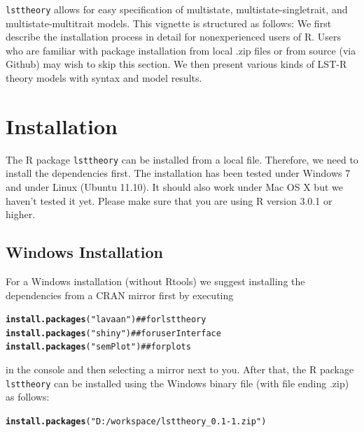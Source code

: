\documentclass[10pt]{article}\usepackage{graphicx, color}
\makeatletter
\newcommand{\hlfunctioncall}[1]{\textcolor[rgb]{0.501960784313725,0,0.329411764705882}{\textbf{#1}}}%
\newcommand{\hlstring}[1]{\textcolor[rgb]{0.6,0.6,1}{#1}}%
\newenvironment{kframe}{%
 \def\at@end@of@kframe{}%
 \ifinner\ifhmode%
  \def\at@end@of@kframe{\end{minipage}}%
  \begin{minipage}{\columnwidth}%
 \fi\fi%
 \def\FrameCommand##1{\hskip\@totalleftmargin \hskip-\fboxsep
 \colorbox{shadecolor}{##1}\hskip-\fboxsep
     \hskip-\linewidth \hskip-\@totalleftmargin \hskip\columnwidth}%
 \MakeFramed {\advance\hsize-\width
   \@totalleftmargin\z@ \linewidth\hsize
   \@setminipage}}%
 {\par\unskip\endMakeFramed%
 \at@end@of@kframe}
\newenvironment{knitrout}{}{} %
\makeatother
\begin{document}
\texttt{lsttheory} allows for easy specification of multistate, multistate-singletrait, and multistate-multitrait models. This vignette is structured as follows: We first describe the installation process in detail for nonexperienced users of \textsf{R}. Users who are familiar with package installation from local .zip files or from source (via Github) may wish to skip this section. We then present various kinds of LST-R theory models with syntax and model results.



\section{Installation}

The \textsf{R} package \texttt{lsttheory} can be installed from a local file. Therefore, we need to install the dependencies first. The installation has been tested under Windows 7 and under Linux (Ubuntu 11.10). It should also work under Mac OS X but we haven't tested it yet. Please make sure that you are using R version 3.0.1 or higher.

\subsection{Windows Installation}

For a Windows installation (without Rtools) we suggest installing the dependencies from a CRAN mirror first by executing
%
\begin{knitrout}
\color{fgcolor}\begin{kframe}
\begin{alltt}
\hlfunctioncall{install.packages}(\hlstring{"lavaan"})  ## for lsttheory
\hlfunctioncall{install.packages}(\hlstring{"shiny"})  ## for user Interface
\hlfunctioncall{install.packages}(\hlstring{"semPlot"})  ## for plots
\end{alltt}
\end{kframe}
\end{knitrout}

%
in the console and then selecting a mirror next to you. After that, the \textsf{R} package \texttt{lsttheory} can be installed using the Windows binary file (with file ending .zip) as follows:
%
\begin{knitrout}
\color{fgcolor}\begin{kframe}
\begin{alltt}
\hlfunctioncall{install.packages}(\hlstring{"D:/workspace/lsttheory_0.1-1.zip"})
\end{alltt}
\end{kframe}
\end{knitrout}
\end{document}
